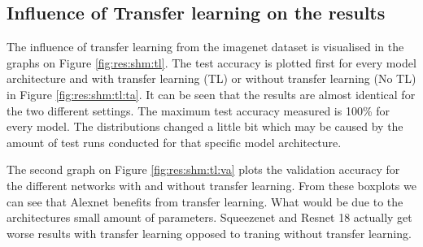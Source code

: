 \subsection{Influence of Transfer learning on the results}
	The influence of transfer learning from the imagenet dataset is visualised in the graphs on Figure \ref{fig:res:shm:tl}. The test accuracy is plotted first for every model architecture and with transfer learning (TL) or without transfer learning (No TL) in Figure \ref{fig:res:shm:tl:ta}. It can be seen that the results are almost identical for the two different settings. The maximum test accuracy measured is 100\% for every model. The distributions changed a little bit which may be caused by the amount of test runs conducted for that specific model architecture.

The second graph on Figure \ref{fig:res:shm:tl:va} plots the validation accuracy for the different networks with and without transfer learning. From these boxplots we can see that Alexnet benefits from transfer learning. What would be due to the architectures small amount of parameters. Squeezenet and Resnet 18 actually get worse results with transfer learning opposed to traning without transfer learning.


